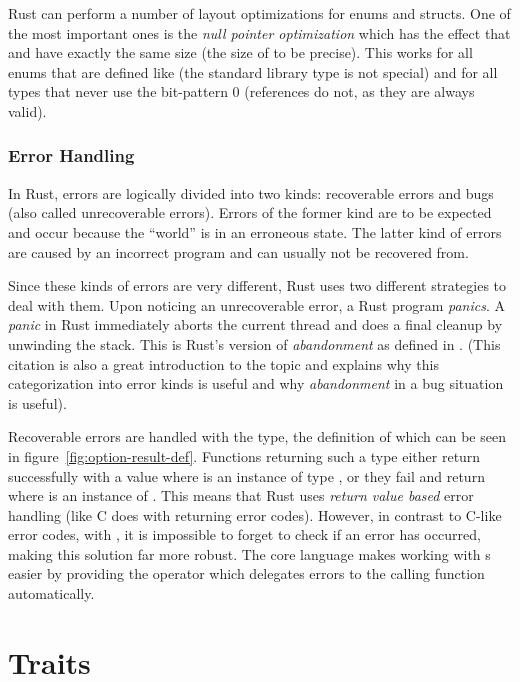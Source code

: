 Rust can perform a number of layout optimizations for enums and structs.
One of the most important ones is the \emph{null pointer optimization} which has the effect that  and  have exactly the same size (the size of  to be precise).
This works for all enums that are defined like  (the standard library type is not special) and for all types that never use the bit-pattern 0 (references do not, as they are always valid).


\subsubsection*{Error Handling}

In Rust, errors are logically divided into two kinds: recoverable errors and bugs (also called unrecoverable errors).
Errors of the former kind are to be expected and occur because the \enquote{world} is in an erroneous state.
The latter kind of errors are caused by an incorrect program and can usually not be recovered from.

Since these kinds of errors are very different, Rust uses two different strategies to deal with them.
Upon noticing an unrecoverable error, a Rust program \emph{panics}.
A \emph{panic} in Rust immediately aborts the current thread and does a final cleanup by unwinding the stack.
This is Rust's version of \emph{abandonment} as defined in \cite{duffy2016error}.
(This citation is also a great introduction to the topic and explains why this categorization into error kinds is useful and why \emph{abandonment} in a bug situation is useful).

Recoverable errors are handled with the  type, the definition of which can be seen in figure~\ref{fig:option-result-def}.
Functions returning such a type either return successfully with a value  where  is an instance of type , or they fail and return  where  is an instance of .
This means that Rust uses \emph{return value based} error handling (like C does with returning error codes).
However, in contrast to C-like error codes, with , it is impossible to forget to check if an error has occurred, making this solution far more robust.
The core language makes working with s easier by providing the  operator which delegates errors to the calling function automatically.

\vfill
\section{Traits}

